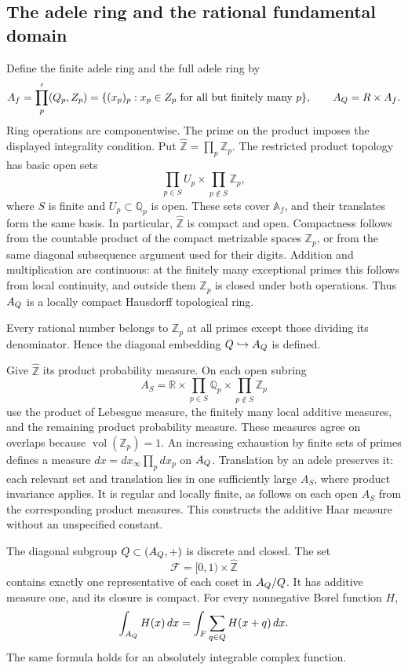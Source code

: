 \subsection{The adele ring and the rational fundamental domain}
\label{sec:adeles-fundamental-domain}

Define the finite adele ring and the full adele ring by
\[
 A_f=\prod_p'(Q_p,Z_p)
 =\{(x_p)_p:x_p\in Z_p\text{ for all but finitely many }p\},
 \qquad A_{Q}=R\times A_f.
\]
Ring operations are componentwise. The prime on the product imposes the
displayed integrality condition. Put \(\widehat{\mathbb Z}=\prod_p\mathbb Z_p\).
The restricted product topology has basic open sets
\[
 \prod_{p\in S}U_p\times\prod_{p\notin S}\mathbb Z_p,
\]
where \(S\) is finite and \(U_p\subset\mathbb Q_p\) is open.
These sets cover \(\mathbb A_f\), and their translates form the same basis.
In particular, \(\widehat{\mathbb Z}\) is compact and open. Compactness follows from
the countable product of the compact metrizable spaces \(\mathbb Z_p\), or from
the same diagonal subsequence argument used for their digits.
Addition and multiplication are continuous: at the finitely many
exceptional primes this follows from local continuity, and outside them
\(\mathbb Z_p\) is closed under both operations. Thus \(A_{Q}\) is a locally
compact Hausdorff topological ring.

Every rational number belongs to \(\mathbb Z_p\) at all primes except those
dividing its denominator. Hence the diagonal embedding
\(Q\hookrightarrow A_{Q}\) is defined.

Give \(\widehat{\mathbb Z}\) its product probability measure. On each open subring
\[
 A_S=\mathbb R\times\prod_{p\in S}\mathbb Q_p\times\prod_{p\notin S}\mathbb Z_p
\]
use the product of Lebesgue measure, the finitely many local additive
measures, and the remaining product probability measure.
These measures agree on overlaps because \(\operatorname{vol}(\mathbb Z_p)=1\).
An increasing exhaustion by finite sets of primes defines a measure
\(dx=dx_\infty\prod_pdx_p\) on \(A_{Q}\).
Translation by an adele preserves it: each relevant set and translation
lies in one sufficiently large \(A_S\), where product invariance applies.
It is regular and locally finite, as follows on each open \(A_S\) from
the corresponding product measures. This constructs the additive Haar
measure without an unspecified constant.

\begin{proposition}
\label{prop:adeles-rational-lattice}
The diagonal subgroup \(Q\subset(A_{Q},+)\) is discrete and closed.
The set
\begin{equation}
 \mathcal F=[0,1)\times\widehat{\mathbb Z}
 \label{eq:adeles-fundamental-domain}
\end{equation}
contains exactly one representative of each coset in \(A_{Q}/Q\).
It has additive measure one, and its closure is compact.
For every nonnegative Borel function \(H\),
\[
 \int_{A_{Q}}H(x)\,dx
 =\int_{F}\sum_{q\in Q}H(x+q)\,dx.
\]
The same formula holds for an absolutely integrable complex function.
\end{proposition}

